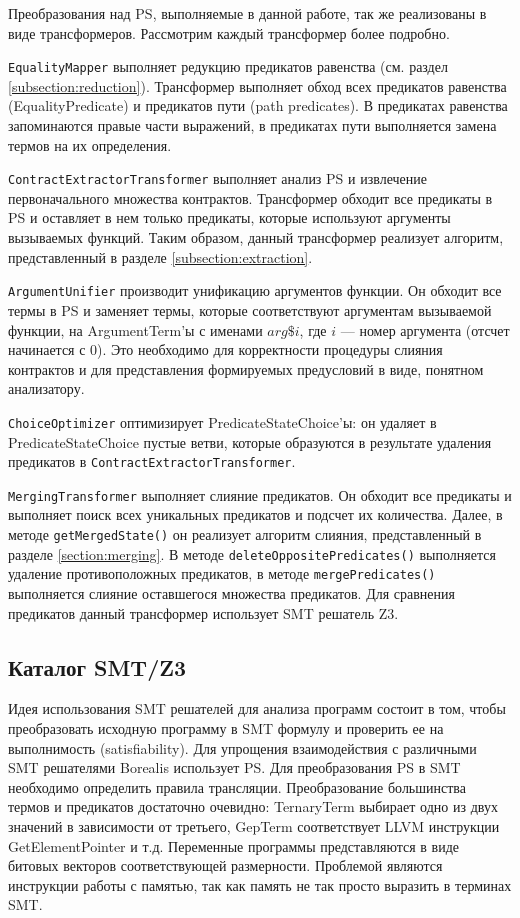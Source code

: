 Преобразования над PS, выполняемые в данной работе, так же реализованы в виде трансформеров. Рассмотрим каждый трансформер более подробно.

\texttt{EqualityMapper} выполняет редукцию предикатов равенства (см. раздел \ref{subsection:reduction}). Трансформер выполняет обход всех предикатов равенства (EqualityPredicate) и предикатов пути (path predicates). В предикатах равенства запоминаются правые части выражений, в предикатах пути выполняется замена термов на их определения.

\texttt{ContractExtractorTransformer} выполняет анализ PS и извлечение первоначального множества контрактов. Трансформер обходит все предикаты в PS и оставляет в нем только предикаты, которые используют аргументы вызываемых функций. Таким образом, данный трансформер реализует алгоритм, представленный в разделе \ref{subsection:extraction}.

\texttt{ArgumentUnifier} производит унификацию аргументов функции. Он обходит все термы в PS и заменяет термы, которые соответствуют аргументам вызываемой функции, на ArgumentTerm'ы с именами $arg\$i$, где $i$ --- номер аргумента (отсчет начинается с 0). Это необходимо для корректности процедуры слияния контрактов и для представления формируемых предусловий в виде, понятном анализатору.

\texttt{ChoiceOptimizer} оптимизирует PredicateStateChoice'ы: он удаляет в PredicateStateChoice пустые ветви, которые образуются в результате удаления предикатов в \texttt{ContractExtractorTransformer}.

\texttt{MergingTransformer} выполняет слияние предикатов. Он обходит все предикаты и выполняет поиск всех уникальных предикатов и подсчет их количества. Далее, в методе \texttt{getMergedState()} он реализует алгоритм слияния, представленный в разделе \ref{section:merging}. В методе \texttt{deleteOppositePredicates()} выполняется удаление противоположных предикатов, в методе \texttt{mergePredicates()} выполняется слияние оставшегося множества предикатов. Для сравнения предикатов данный трансформер использует SMT решатель Z3\cite{z3solver}.

\subsection{Каталог SMT/Z3}
Идея использования SMT решателей для анализа программ состоит в том, чтобы преобразовать исходную программу в SMT формулу и проверить ее на выполнимость (satisfiability). Для упрощения взаимодействия с различными SMT решателями Borealis использует PS. Для преобразования PS в SMT необходимо определить правила трансляции. Преобразование большинства термов и предикатов достаточно очевидно: TernaryTerm выбирает одно из двух значений в зависимости от третьего, GepTerm соответствует LLVM инструкции GetElementPointer и т.д. Переменные программы представляются в виде битовых векторов соответствующей размерности. Проблемой являются инструкции работы с памятью, так как память не так просто выразить в терминах SMT.


